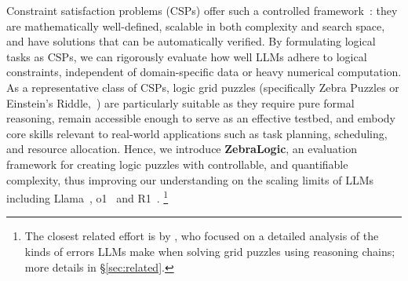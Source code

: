 
Constraint satisfaction problems (CSPs) offer such a controlled framework~\citep{dechter2003constraint}: they are mathematically well-defined, scalable in both complexity and search space, and have solutions that can be automatically verified. By formulating logical tasks as CSPs, we can rigorously evaluate how well LLMs adhere to logical constraints, independent of domain-specific data or heavy numerical computation. As a representative class of CSPs, logic grid puzzles (specifically Zebra Puzzles or Einstein’s Riddle,~\cite{Prosser1993HYBRIDAF}) are particularly suitable as they require pure formal reasoning, remain accessible enough to serve as an effective testbed, and embody core skills relevant to real-world applications such as task planning, scheduling, and resource allocation. Hence, we introduce \textbf{ZebraLogic}, an evaluation framework for creating logic puzzles with controllable, and quantifiable complexity, thus improving our understanding on the scaling limits of LLMs including Llama~\citep{llama3modelcard}, o1~\citep{o1-short} and R1~\citep{deepseek-r1-short}.
\footnote{The closest related effort is by \citet{Tyagi2024StepbyStepRT}, who focused on a detailed analysis of the kinds of errors LLMs make when solving grid puzzles using reasoning chains; more details in \S\ref{sec:related}.}

